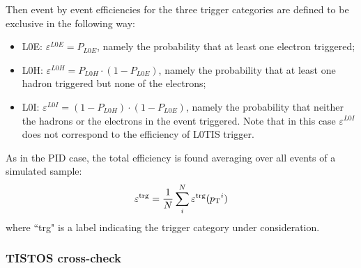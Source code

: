 Then event by event efficiencies for the three trigger categories are defined to be exclusive in the following way:
%
\begin{itemize}
\item L0E: $\varepsilon^{L0E} = P_{L0E}$, namely the probability that at least one electron triggered;
\item L0H: $\varepsilon^{L0H} = P_{L0H}\cdot(1 - P_{L0E})$, namely the probability that at least one hadron triggered but none of the electrons;
\item L0I: $\varepsilon^{L0I} = (1-P_{L0H})\cdot(1 - P_{L0E})$, namely the probability that neither the hadrons or the electrons in the event triggered. Note that in this case $\varepsilon^{L0I} $ does not correspond to the efficiency of L0TIS trigger.
\end{itemize}
%
As in the PID case, the total efficiency is found averaging over all events of a simulated sample:
%
\begin{equation}
\varepsilon^{\rm trg} = \frac{1}{N} \sum_i^N \varepsilon^{\rm trg}(\mbox{$p_{\rm T}$}^i)
\end{equation}
\noindent
where ``trg" is a label indicating the trigger category under consideration.

\subsubsection{TISTOS cross-check}
\label{sec:tistos}

